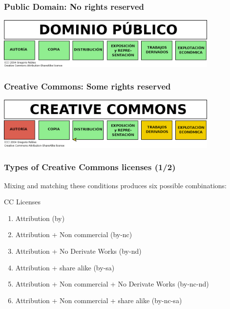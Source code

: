 
\begin{frame}
\frametitle{Public Domain: No rights reserved}

\includegraphics[width=11cm]{figs/DominioPublico.png}

\end{frame}


\begin{frame}
\frametitle{Creative Commons: Some rights reserved}

\includegraphics[width=11cm]{figs/CreativeCommons.png}

\end{frame}


\begin{frame}
\frametitle{Types of Creative Commons licenses (1/2)}

Mixing and matching these conditions produces six possible combinations:

\begin{block}{CC Licenses}
\begin{enumerate}
\item Attribution (by)
\item Attribution + Non commercial (by-nc)
\item Attribution + No Derivate Works (by-nd)
\item Attribution + share alike (by-sa)
\item Attribution + Non commercial + No Derivate Works (by-nc-nd)
\item Attribution + Non commercial + share alike (by-nc-sa)
\end{enumerate}                                                 
\end{block}
\end{frame}


